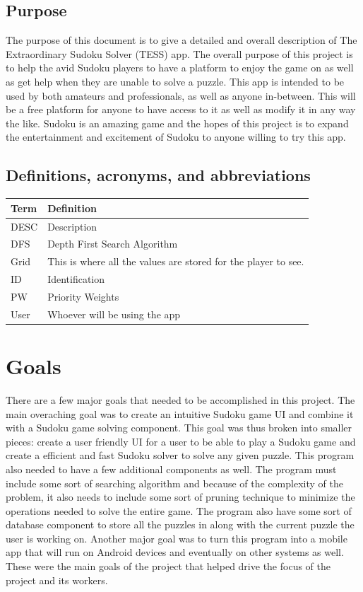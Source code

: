 \documentclass{article}
\begin{document}
\subsection{Purpose}
The purpose of this document is to give a detailed and overall description of The Extraordinary Sudoku Solver (TESS) app. The overall purpose of this project is to help the avid Sudoku players to have a platform to enjoy the game on as well as get help when they are unable to solve a puzzle. This app is intended to be used by both amateurs and professionals, as well as anyone in-between. This will be a free platform for anyone to have access to it as well as modify it in any way the like. Sudoku is an amazing game and the hopes of this project is to expand the entertainment and excitement of Sudoku to anyone willing to try this app.

\subsection{Definitions, acronyms, and abbreviations}

\begin{tabular}{ | m{8em} | m{24em}|  } 
\hline
\textbf{Term}& \textbf{Definition}  \\ 
\hline
DESC & Description  \\ 
\hline
DFS & Depth First Search Algorithm\\
\hline
Grid & This is where all the values are stored for the player to see.  \\ 
\hline
ID & Identification  \\ 
\hline
PW & Priority Weights  \\ 
\hline
User & Whoever will be using the app  \\ 
\hline
\end{tabular}

 

\section{Goals}
There are a few major goals that needed to be accomplished in this project. The main overaching goal was to create an intuitive Sudoku game UI and combine it with a Sudoku game solving component. This goal was thus broken into smaller pieces: create a user friendly UI for a user to be able to play a Sudoku game and create a efficient and fast Sudoku solver to solve any given puzzle. This program also needed to have a few additional components as well. The program must include some sort of searching algorithm and because of the complexity of the problem, it also needs to include some sort of pruning technique to minimize the operations needed to solve the entire game. The program also have some sort of database component to store all the puzzles in along with the current puzzle the user is working on. Another major goal was to turn this program into a mobile app that will run on Android devices and eventually on other systems as well. These were the main goals of the project that helped drive the focus of the project and its workers.
\end{document}

